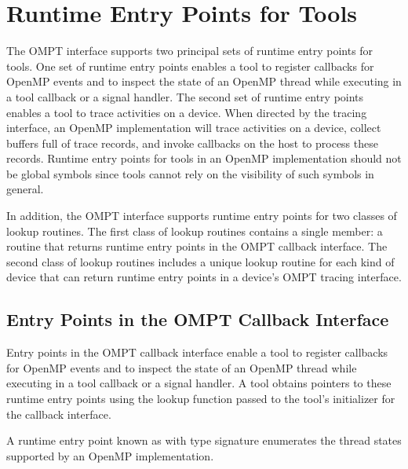 \section{Runtime Entry Points for Tools}
\label{sec:entry-points}

The OMPT interface supports two principal sets of runtime entry points for tools. One
set of runtime entry points enables a tool to register callbacks for OpenMP
events and to inspect the state of an OpenMP thread while
executing in a tool callback or a signal handler. The second set of runtime entry points enables a
tool to trace activities on a device. When directed by the tracing
interface, an OpenMP implementation will trace activities on a device, collect
buffers full of trace records, and invoke callbacks on the host to
process these records. 
Runtime entry points for tools in an OpenMP implementation
should not be global symbols since tools cannot rely on the visibility
of such symbols in general.

In addition, the OMPT interface supports
runtime entry points for two classes of lookup routines. The first
class of lookup routines contains a single member: a
routine that returns runtime entry points in the OMPT callback interface. 
The second class of lookup routines includes 
a unique lookup routine for each kind of
device that can return runtime entry points in a device's OMPT tracing interface.

\subsection{Entry Points in the OMPT Callback Interface}
\label{sec:ompt-callback-entry-points}

Entry points in the OMPT callback interface enable a tool to register
callbacks for OpenMP events and to inspect the state of an OpenMP thread while
executing in a tool callback or a signal handler. 
A tool obtains pointers to these runtime entry points 
using the lookup function passed to the tool's initializer for the
callback interface.

\label{sec:ompt_enumerate_states_t}
\label{sec:ompt_enumerate_states}

\summary
A runtime entry point known as  
with type signature  
enumerates the thread states supported by an OpenMP 
implementation.

\format

